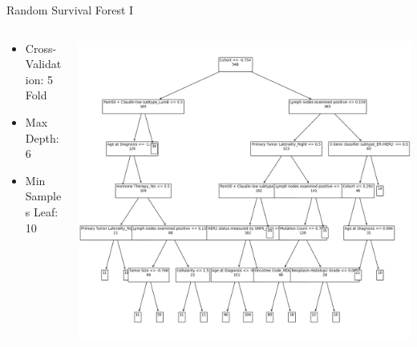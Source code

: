 \documentclass{beamer}
\begin{document}
\begin{frame}{Random Survival Forest I}
    \begin{columns}
        \begin{column}{0.49 \textwidth}
		\begin{itemize}
		\item Cross-Validation: 5 Fold
		\item Max Depth: 6
		\item Min Samples Leaf: 10
		\end{itemize}
        \end{column}
        \begin{column}{0.49 \textwidth}
            \centering
            \includegraphics[width = \textwidth]{images/rsf_tree.png}
        \end{column}
    \end{columns}
\end{frame}
\end{document}
